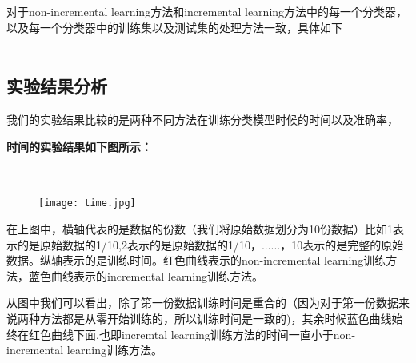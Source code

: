 \documentclass[master]{njuthesis}
\begin{document}
    对于non-incremental learning方法和incremental learning方法中的每一个分类器，以及每一个分类器中的训练集以及测试集的处理方法一致，具体如下\\
\\  

\subsection{实验结果分析}
    
    我们的实验结果比较的是两种不同方法在训练分类模型时候的时间以及准确率，
    
    \large{\textbf{时间的实验结果如下图所示：}}\\
\\
\\

    \begin{figure}[htbp]
      \centering
      \texttt{[image: time.jpg]}\\
      \caption{}\label{fig:time}
    \end{figure}

    在上图中，横轴代表的是数据的份数（我们将原始数据划分为10份数据）比如1表示的是原始数据的1/10,2表示的是原始数据的1/10，......，10表示的是完整的原始数据。纵轴表示的是训练时间。红色曲线表示的non-incremental learning训练方法，蓝色曲线表示的incremental learning训练方法。

    从图中我们可以看出，除了第一份数据训练时间是重合的（因为对于第一份数据来说两种方法都是从零开始训练的，所以训练时间是一致的)，其余时候蓝色曲线始终在红色曲线下面,也即incremtal learning训练方法的时间一直小于non-incremental learning训练方法。
\\
\\
\end{document}
